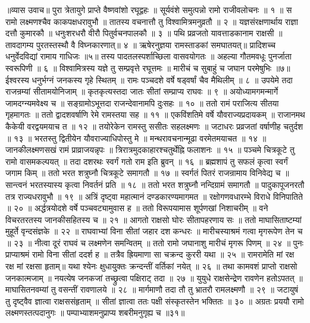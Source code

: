 ॥व्यास उवाच॥
पुरा त्रेतायुगे प्राप्ते वैष्णवांशो रघूद्वहः ॥
सूर्यवंशे समुत्पन्नो रामो राजीवलोचनः ॥ १ ॥
स रामो लक्ष्मणश्चैव काकपक्षधरावुभौ ॥
तातस्य वचनात्तौ तु विश्वामित्रमनुव्रतौ ॥ २ ॥
यज्ञसंरक्षणार्थाय राज्ञा दत्तौ कुमारकौ ॥
धनुःशरधरौ वीरौ पितुर्वचनपालकौ ॥ ३ ॥
पथि प्रव्रजतो यावत्ताडकानाम राक्षसी ॥
तावदागम्य पुरतस्तस्थौ वै विघ्नकारणात्॥ ४ ॥
ऋषेरनुज्ञया रामस्ताडकां समघातयत्॥
प्रादिशच्च धनुर्वेदविद्यां रामाय गाधिजः ॥५॥
तस्य पादतलस्पर्शाच्छिला वासवयोगतः ॥
अहल्या गौतमवधूः पुनर्जाता स्वरूपिणी ॥ ६ ॥
विश्वामित्रस्य यज्ञे तु सम्प्रवृत्ते रघूत्तमः ॥
मारीचं च सुबाहुं च जघान परमेषुभिः ॥७॥
ईश्वरस्य धनुर्भग्नं जनकस्य गृहे स्थितम् ॥
रामः पञ्चदशे वर्षे षड्वर्षां चैव मैथिलीम् ॥ ८ ॥
उपयेमे तदा राजन्रम्यां सीतामयोनिजाम् ॥
कृतकृत्यस्तदा जातः सीतां सम्प्राप्य राघवः ॥ ९ ॥
अयोध्यामगमन्मार्गे जामदग्न्यमवेक्ष्य च ॥
सङ्ग्रामोऽभूत्तदा राजन्देवानामपि दुःसहः ॥ १० ॥
ततो रामं पराजित्य सीतया गृहमागतः ॥
ततो द्वादशवर्षाणि रेमे रामस्तया सह ॥ ११ ॥
एकविंशतिमे वर्षे यौवराज्यप्रदायकम् ॥
राजानमथ कैकेयी वरद्वयमयाच त ॥ १२ ॥
तयोरेकेन रामस्तु ससीतः सहलक्ष्मणः ॥
जटाधरः प्रव्रजतां वर्षाणीह चतुर्दश ॥ १३ ॥
भरतस्तु द्वितीयेन यौवराज्याधिपोस्तु मे ॥
मन्थरावचनान्मूढा वरमेतमयाचत ॥ १४ ॥
जानकीलक्ष्मणसखं रामं प्राव्राजयन्नृपः ॥
त्रिरात्रमुदकाहारश्चतुर्थेह्नि फलाशनः ॥ १५ ॥
पञ्चमे चित्रकूटे तु रामो वासमकल्पयत् ॥
तदा दशरथः स्वर्गं गतो राम इति ब्रुवन् ॥ १६ ॥
ब्रह्मशापं तु सफलं कृत्वा स्वर्गं जगाम किम् ॥
ततो भरत शत्रुघ्नौ चित्रकूटे समागतौ ॥ १७ ॥
स्वर्गतं पितरं राजन्रामाय विनिवेद्य च ॥
सान्त्वनं भरतस्यास्य कृत्वा निवर्तनं प्रति ॥ १८ ॥
ततो भरत शत्रुघ्नौ नन्दिग्रामं समागतौ ॥
पादुकापूजनरतौ तत्र राज्यधरावुभौ ॥ १९ ॥
अत्रिं दृष्ट्वा महात्मानं दण्डकारण्यमागमत ॥
रक्षोगणवधारम्भे विराधे विनिपातिते ॥ २० ॥
अर्द्धत्रयोदशे वर्षे पञ्चवट्यामुवास ह ॥
ततो विरूपयामास शूर्पणखां निशाचरीम् ॥
वने विचरतरतस्य जानकीसहितस्य च ॥ २१ ॥
आगतो राक्षसो घोरः सीतापहरणाय सः ॥
ततो माघासिताष्टम्यां मुहूर्ते वृन्दसंज्ञके ॥ २२ ॥
राघवाभ्यां विना सीतां जहार दश कन्धरः ॥
मारीचस्याश्रमं गत्वा मृगरूपेण तेन च ॥ २३ ॥
नीत्वा दूरं राघवं च लक्ष्मणेन समन्वितम् ॥
ततो रामो जघानाशु मारीचं मृगरू पिणम् ॥ २४ ॥
पुनः प्राप्याश्रमं रामो विना सीतां ददर्श ह ॥
तत्रैव ह्रियमाणा सा चक्रन्द कुररी यथा ॥ २५ ॥
रामरामेति मां रक्ष रक्ष मां रक्षसा हृताम्॥
यथा श्येनः क्षुधायु्क्तः क्रन्दन्तीं वर्तिकां नयेत् ॥ २६ ॥
तथा कामवशं प्राप्तो राक्षसो जनकात्मजाम् ॥
नयत्येष जनकजां तच्छ्रुत्वा पक्षिराट् तदा ॥ २७ ॥
युयुधे राक्षसेन्द्रेण रावणेन हतोऽपतत् ॥
माघासितनवम्यां तु वसन्तीं रावणालये ॥ २८ ॥
मार्गमाणौ तदा तौ तु भ्रातरौ रामलक्ष्मणौ ॥ २९ ॥
जटायुषं तु दृष्ट्वैव ज्ञात्वा राक्षससंहृताम् ॥
सीतां ज्ञात्वा ततः पक्षी संस्कृतस्तेन भक्तितः ॥ ३० ॥
अग्रतः प्रययौ रामो लक्ष्मणस्तत्पदानुगः ॥
पम्पाभ्याशमनुप्राप्य शबरीमनुगृह्य च ॥३१॥

